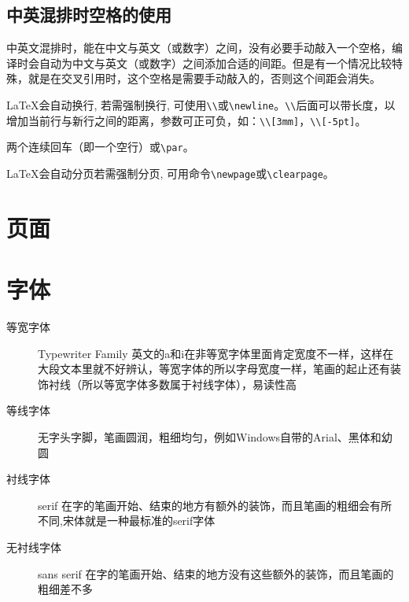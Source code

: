 {\subsection*{中英混排时空格的使用}
中英文混排时，\XeLaTeX{}能在中文与英文（或数字）之间，没有必要手动敲入一个空格，编译时会自动为中文与英文（或数字）之间添加合适的间距。但是有一个情况比较特殊，就是在交叉引用时，这个空格是需要手动敲入的，否则这个间距会消失。

\begin{description}[labelwidth=4em]
    \item[换行] \LaTeX{}会自动换行, 若需强制换行, 可使用\lstinline|\\|或\lstinline|\newline|。\lstinline|\\|后面可以带长度，以增加当前行与新行之间的距离，参数可正可负，如：\lstinline|\\[3mm]|，\lstinline|\\[-5pt]|。
    \item[分段] 两个连续回车（即一个空行）或\lstinline|\par|。
    \item[分页] \LaTeX{}会自动分页若需强制分页, 可用命令\lstinline|\newpage|或\lstinline|\clearpage|。
\end{description}

\section{页面}

\section{字体}

\begin{description}
    \item[等宽字体] Typewriter Family 英文的a和i在非等宽字体里面肯定宽度不一样，这样在大段文本里就不好辨认，等宽字体的所以字母宽度一样，笔画的起止还有装饰衬线（所以等宽字体多数属于衬线字体），易读性高
    \item[等线字体] 无字头字脚，笔画圆润，粗细均匀，例如Windows自带的Arial、黑体和幼圆
    \item[衬线字体] serif 在字的笔画开始、结束的地方有额外的装饰，而且笔画的粗细会有所不同,宋体就是一种最标准的serif字体
    \item[无衬线字体] sans serif 在字的笔画开始、结束的地方没有这些额外的装饰，而且笔画的粗细差不多
\end{description}

}
